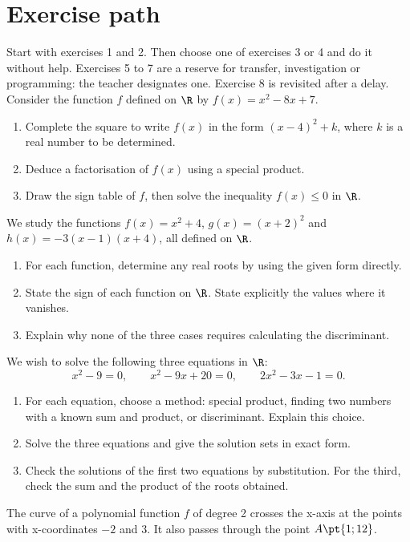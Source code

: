 \section*{Exercise path}\label{C02-PARC}
Start with exercises 1 and 2. Then choose one of exercises 3 or 4 and do it without help. Exercises 5 to 7 are a reserve for transfer, investigation or programming: the teacher designates one. Exercise 8 is revisited after a delay.
\begingroup
{}
Consider the function $f$ defined on $\R$ by $f(x)=x^2-8x+7$.
\begin{enumerate}[label=\arabic*.]
\item Complete the square to write $f(x)$ in the form $(x-4)^2+k$, where $k$ is a real number to be determined.
\item Deduce a factorisation of $f(x)$ using a special product.
\item Draw the sign table of $f$, then solve the inequality $f(x)\leq0$ in $\R$.
\end{enumerate}
We study the functions $f(x)=x^2+4$, $g(x)=(x+2)^2$ and $h(x)=-3(x-1)(x+4)$, all defined on $\R$.
\begin{enumerate}[label=\arabic*.]
\item For each function, determine any real roots by using the given form directly.
\item State the sign of each function on $\R$. State explicitly the values where it vanishes.
\item Explain why none of the three cases requires calculating the discriminant.
\end{enumerate}
We wish to solve the following three equations in $\R$:\[x^2-9=0,\qquad x^2-9x+20=0,\qquad 2x^2-3x-1=0.\]
\begin{enumerate}[label=\arabic*.]
\item For each equation, choose a method: special product, finding two numbers with a known sum and product, or discriminant. Explain this choice.
\item Solve the three equations and give the solution sets in exact form.
\item Check the solutions of the first two equations by substitution. For the third, check the sum and the product of the roots obtained.
\end{enumerate}
The curve of a polynomial function $f$ of degree 2 crosses the x-axis at the points with x-coordinates $-2$ and 3. It also passes through the point $A\pt{1;12}$.
